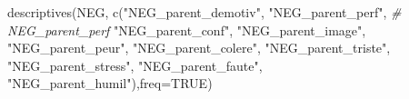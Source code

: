 \documentclass[
]{article}
\newenvironment{Shaded}{\begin{snugshade}}{\end{snugshade}}
\newcommand{\AttributeTok}[1]{\textcolor[rgb]{0.77,0.63,0.00}{#1}}
\newcommand{\CommentTok}[1]{\textcolor[rgb]{0.56,0.35,0.01}{\textit{#1}}}
\newcommand{\ConstantTok}[1]{\textcolor[rgb]{0.00,0.00,0.00}{#1}}
\newcommand{\FunctionTok}[1]{\textcolor[rgb]{0.00,0.00,0.00}{#1}}
\newcommand{\NormalTok}[1]{#1}
\newcommand{\StringTok}[1]{\textcolor[rgb]{0.31,0.60,0.02}{#1}}
\begin{document}
\begin{Shaded}
\begin{Highlighting}[]
\FunctionTok{descriptives}\NormalTok{(NEG, }\FunctionTok{c}\NormalTok{(}\StringTok{"NEG\_parent\_demotiv"}\NormalTok{, }
                    \StringTok{"NEG\_parent\_perf"}\NormalTok{, }
                \CommentTok{\#    NEG\_parent\_perf}
                    \StringTok{"NEG\_parent\_conf"}\NormalTok{, }
                    \StringTok{"NEG\_parent\_image"}\NormalTok{, }
                    \StringTok{"NEG\_parent\_peur"}\NormalTok{, }
                    \StringTok{"NEG\_parent\_colere"}\NormalTok{, }
                    \StringTok{"NEG\_parent\_triste"}\NormalTok{, }
                    \StringTok{"NEG\_parent\_stress"}\NormalTok{, }
                    \StringTok{"NEG\_parent\_faute"}\NormalTok{, }
                    \StringTok{"NEG\_parent\_humil"}\NormalTok{),}\AttributeTok{freq=}\ConstantTok{TRUE}\NormalTok{)}
\end{Highlighting}
\end{Shaded}
\end{document}
